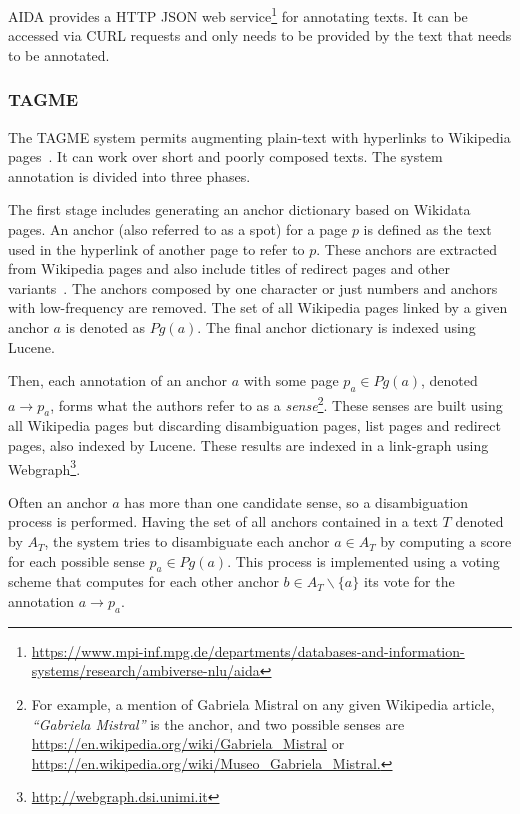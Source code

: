 AIDA provides a HTTP JSON web service\footnote{\url{https://www.mpi-inf.mpg.de/departments/databases-and-information-systems/research/ambiverse-nlu/aida}} 
for annotating texts. It can be accessed via CURL requests and only needs to be provided by the 
text that needs to be annotated.

\subsubsection{TAGME}
\label{cap3:infExtr/entityLinking/tagme}
The TAGME system permits augmenting plain-text with hyperlinks to Wikipedia 
pages~\cite{EL:tagme-FerraginaS10}. It can work over short and poorly composed texts. The system 
annotation is divided into three phases.

The first stage includes generating an anchor dictionary based on Wikidata pages. An anchor 
(also referred to as a spot) for a page $p$ is defined as the text used in the hyperlink of 
another page to refer to $p$. These anchors are extracted from Wikipedia pages and also include 
titles of redirect pages and other variants~\cite{entLib:Cucerzan07}. The anchors composed by 
one character or just numbers and anchors with low-frequency are removed. The set of all 
Wikipedia pages linked by a given anchor $a$ is denoted as $Pg(a)$. The final anchor dictionary 
is indexed using Lucene. 

Then, each annotation of an anchor $a$ with some page $p_a \in Pg(a)$, denoted 
$a \rightarrow p_a$, forms what the authors refer to as a \textit{sense}\footnote{For example, 
a mention of Gabriela Mistral on any given Wikipedia article, \textit{“Gabriela Mistral”} is the 
anchor, and two possible senses are \url{https://en.wikipedia.org/wiki/Gabriela\_Mistral} or 
\url{https://en.wikipedia.org/wiki/Museo\_Gabriela\_Mistral.}}. These senses are built using all 
Wikipedia pages but discarding disambiguation pages, list pages and redirect pages, also indexed 
by Lucene. These results are indexed in a link-graph using 
Webgraph\footnote{\url{http://webgraph.dsi.unimi.it}}.

Often an anchor $a$ has more than one candidate sense, so a disambiguation process is performed. 
Having the set of all anchors contained in a text $T$ denoted by $A_T$, the system tries to 
disambiguate each anchor $a \in A_T$ by computing a score for each possible sense 
$p_a \in Pg(a)$. This process is implemented using a voting scheme that computes for each other 
anchor $b \in A_T \backslash \{a\}$ its vote for the annotation $a \rightarrow p_a$.

